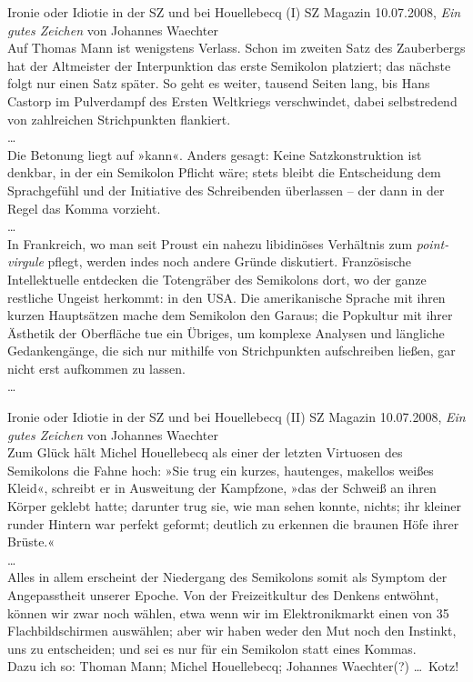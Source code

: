 \begin{frame}
  {Ironie oder Idiotie in der SZ und bei Houellebecq (I)}
  \footnotesize
  SZ Magazin 10.07.2008, \textit{Ein gutes Zeichen} von Johannes Waechter\\
  \Zeile
  Auf Thomas Mann ist wenigstens Verlass. Schon im zweiten Satz des Zauberbergs hat der Altmeister der Interpunktion das erste Semikolon platziert; das nächste folgt nur einen Satz später. So geht es weiter, tausend Seiten lang, bis Hans Castorp im Pulverdampf des Ersten Weltkriegs verschwindet, dabei selbstredend von zahlreichen Strichpunkten flankiert.\\
  \ldots\\
  Die Betonung liegt auf »kann«. Anders gesagt: Keine Satzkonstruktion ist denkbar, in der ein Semikolon Pflicht wäre; stets bleibt die Entscheidung dem Sprachgefühl und der Initiative des Schreibenden überlassen – der dann in der Regel das Komma vorzieht.\\
  \ldots\\
  In Frankreich, wo man seit Proust ein nahezu libidinöses Verhältnis zum \textit{point-virgule} pflegt, werden indes noch andere Gründe diskutiert. Französische Intellektuelle entdecken die Totengräber des Semikolons dort, wo der ganze restliche Ungeist herkommt: in den USA. Die amerikanische Sprache mit ihren kurzen Hauptsätzen mache dem Semikolon den Garaus; die Popkultur mit ihrer Ästhetik der Oberfläche tue ein Übriges, um komplexe Analysen und längliche Gedankengänge, die sich nur mithilfe von Strichpunkten aufschreiben ließen, gar nicht erst aufkommen zu lassen.\\
  \ldots\\
\end{frame}

\begin{frame}
  {Ironie oder Idiotie in der SZ und bei Houellebecq (II)}
  \footnotesize
  SZ Magazin 10.07.2008, \textit{Ein gutes Zeichen} von Johannes Waechter\\
  \Zeile
  Zum Glück hält Michel Houellebecq als einer der letzten Virtuosen des Semikolons die Fahne hoch: »Sie trug ein kurzes, hautenges, makellos weißes Kleid«, schreibt er in Ausweitung der Kampfzone, »das der Schweiß an ihren Körper geklebt hatte; darunter trug sie, wie man sehen konnte, nichts; ihr kleiner runder Hintern war perfekt geformt; deutlich zu erkennen die braunen Höfe ihrer Brüste.«\\
  \ldots\\
  Alles in allem erscheint der Niedergang des Semikolons somit als Symptom der Angepasstheit unserer Epoche. Von der Freizeitkultur des Denkens entwöhnt, können wir zwar noch wählen, etwa wenn wir im Elektronikmarkt einen von 35 Flachbildschirmen auswählen; aber wir haben weder den Mut noch den Instinkt, uns zu entscheiden; und sei es nur für ein Semikolon statt eines Kommas.\\
  \Zeile
  \onslide<+->
  \onslide<+->
  Dazu ich so: \alert{Thoman Mann; Michel Houellebecq; Johannes Waechter(?) \ldots\ Kotz!}
\end{frame}


